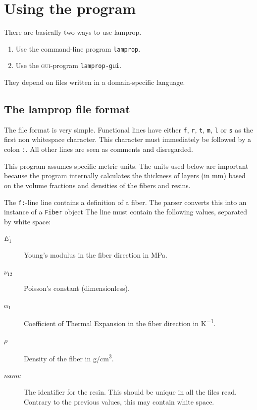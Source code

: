 \documentclass[a4paper,landscape,oneside,11pt,twocolumn]{memoir}
\begin{document}
\chapter{Using the program} %

There are basically two ways to use lamprop.

\begin{enumerate}
    \item Use the command-line program \texttt{lamprop}.
    \item Use the \textsc{gui}-program \texttt{lamprop-gui}.
\end{enumerate}

They depend on files written in a domain-specific language.

\section{The lamprop file format} %

The file format is very simple. Functional lines have either \texttt{f},
\texttt{r}, \texttt{t}, \texttt{m}, \texttt{l} or \texttt{s} as the first
non whitespace character. This character must immediately be followed by
a colon \texttt{:}. All other lines are seen as comments and disregarded.

This program assumes specific metric units. The units used below are important
because the program internally calculates the thickness of layers (in mm)
based on the volume fractions and densities of the fibers and resins.

The \texttt{f:}-line line contains a definition of a fiber. The parser
converts this into an instance of a \texttt{Fiber} object The line must
contain the following values, separated by white space:
\begin{description}
    \item[$E_1$] Young's modulus in the fiber direction in \si{MPa}.
    \item[$\nu_{12}$] Poisson's constant (dimensionless).
    \item[$\alpha_1$] Coefficient of Thermal Expansion in the fiber direction
        in \si{K^{-1}}.
    \item[$\rho$] Density of the fiber in \si{g/cm^3}.
    \item[$name$] The identifier for the resin. This should be unique in all
        the files read. Contrary to the previous values, this may contain
        white space.
\end{description}
\end{document}
